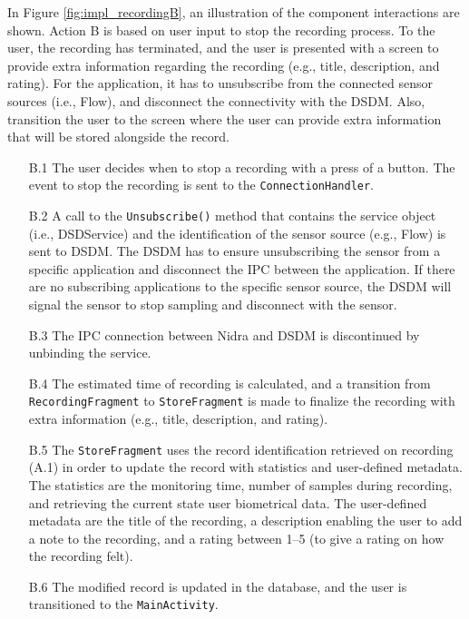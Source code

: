 In Figure \ref{fig:impl_recordingB}, an illustration of the component interactions are shown. Action B is based on user input to stop the recording process. To the user, the recording has terminated, and the user is presented with a screen to provide extra information regarding the recording (e.g., title, description, and rating). For the application, it has to unsubscribe from the connected sensor sources (i.e., Flow), and disconnect the connectivity with the DSDM. Also, transition the user to the screen where the user can provide extra information that will be stored alongside the record.

\begin{itemize}
    \item[B.1] The user decides when to stop a recording with a press of a button. The event to stop the recording is sent to the \verb|ConnectionHandler|.
    \item[B.2] A call to the \verb|Unsubscribe()| method that contains the service object (i.e., DSDService) and the identification of the sensor source (e.g., Flow) is sent to DSDM. The DSDM has to ensure unsubscribing the sensor from a specific application and disconnect the IPC between the application. If there are no subscribing applications to the specific sensor source, the DSDM will signal the sensor to stop sampling and disconnect with the sensor. 
    \item[B.3] The IPC connection between Nidra and DSDM is discontinued by unbinding the service. 
    \item[B.4] The estimated time of recording is calculated, and a transition from \verb|RecordingFragment| to \verb|StoreFragment| is made to finalize the recording with extra information (e.g., title, description, and rating). 
    \item[B.5] The \verb|StoreFragment| uses the record identification retrieved on recording (A.1) in order to update the record with statistics and user-defined metadata. The statistics are the monitoring time, number of samples during recording, and retrieving the current state user biometrical data. The user-defined metadata are the title of the recording, a description enabling the user to add a note to the recording, and a rating between 1--5 (to give a rating on how the recording felt). 
    \item[B.6] The modified record is updated in the database, and the user is transitioned to the \verb|MainActivity|.
\end{itemize}

